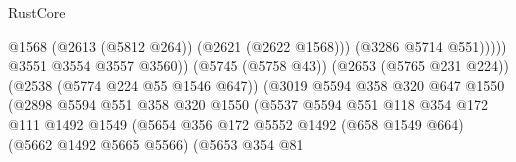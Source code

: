 \begin{lexlean}{RustCore}
\begin{coremodule}
                                                              @1568
                                                              (@2613 (@5812 @264))
                                                              (@2621 (@2622 @1568)))
                                                            (@3286 @5714 @551)))))
                                                    @3551
                                                    @3554
                                                    @3557
                                                    @3560))
                                                (@5745 (@5758 @43))
                                                (@2653 (@5765 @231 @224))
                                                (@2538 (@5774 @224 @55 @1546 @647))
                                                (@3019
                                                  @5594
                                                  @358
                                                  @320
                                                  @647
                                                  @1550
                                                  (@2898
                                                    @5594
                                                    @551
                                                    @358
                                                    @320
                                                    @1550
                                                    (@5537
                                                      @5594
                                                      @551
                                                      @118
                                                      @354
                                                      @172
                                                      @111
                                                      @1492
                                                      @1549
                                                      (@5654
                                                        @356
                                                        @172
                                                        @5552
                                                        @1492
                                                        (@658 @1549 @664)
                                                        (@5662 @1492 @5665 @5566)
                                                        (@5653
                                                          @354
                                                          @81

\end{coremodule}
\end{lexlean}
